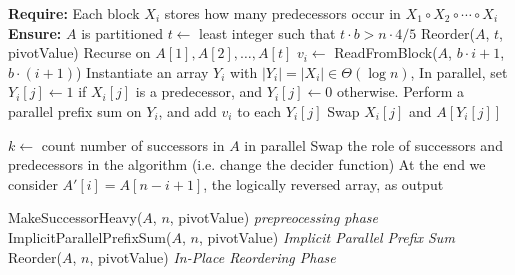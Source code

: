 \documentclass[11pt]{article}
\theoremstyle{remark}
\theoremstyle{remark}
\begin{document}
\begin{figure*}
\begin{algorithmic}
  \State \textbf{Require: } Each block $X_i$ stores how many predecessors occur in $X_1 \circ X_2 \circ \cdots \circ X_i$
  \State \textbf{Ensure: }  $A$ is partitioned
      \State $t \gets $ least integer such that $t\cdot b > n\cdot 4/5$
      \State Reorder($A$, $t$, pivotValue)
      \Comment Recurse on $A[1], A[2], \ldots, A[t]$
      \State $v_i \gets$ ReadFromBlock($A$, $b\cdot i+1$, $b\cdot(i+1)$) 
        \State Instantiate an array $Y_i$ with $|Y_i| = |X_i| \in \Theta(\log n)$, 
        \State In parallel, set $Y_i[j] \gets 1$ if $X_i[j]$ is a predecessor, and $Y_i[j] \gets 0$ otherwise.
        \State Perform a parallel prefix sum on $Y_i$, and add $v_i$ to each $Y_i[j]$
            \State Swap $X_i[j]$ and $A[Y_i[j]]$
          \EndIf
        \EndFor
      \EndFor
    \EndProcedure
    \State

      \State $k \gets$ count number of successors in $A$ in parallel
        \State Swap the role of successors and predecessors in the algorithm (i.e. change the decider function)
        \State At the end we consider $A'[i] = A[n-i+1]$, the logically reversed array, as output
      \EndIf

      \State MakeSuccessorHeavy($A$, $n$, pivotValue) \Comment \emph{prepreocessing phase}
      \State ImplicitParallelPrefixSum($A$, $n$, pivotValue) \Comment \emph{Implicit Parallel Prefix Sum}
      \State Reorder($A$, $n$, pivotValue) \Comment \emph{In-Place Reordering Phase}
    \EndProcedure
	\end{algorithmic}	
\end{figure*}

\clearpage
\clearpage



\end{document}
